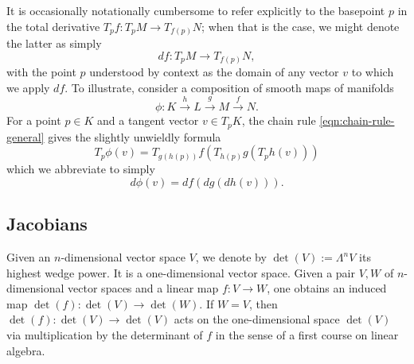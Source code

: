 \documentclass[reqno]{amsart} 
\begin{document}
It is occasionally
notationally cumbersome
to refer explicitly to the basepoint
$p$ in the total derivative $T_p f : T_p M \rightarrow T_{f(p)} N$;
when that is the case, we might denote the latter as simply
\begin{equation*}
d f : T_p M \rightarrow T_{f(p)} N,
\end{equation*}
with the point $p$ understood by context as the domain of any
vector
$v$ to which we apply $d f$.
To illustrate, consider a composition of smooth maps
of manifolds
\begin{equation*}
\phi : K \xrightarrow{h} L \xrightarrow{g} M \xrightarrow{f} N.
\end{equation*}
For a point $p \in K$ and a tangent vector $v \in T_p K$,
the chain rule \eqref{eqn:chain-rule-general}
gives the slightly unwieldly formula
\begin{equation*}
T_p \phi(v)
=
T_{g(h(p))} f
(
T_{h(p)} g(
T_p h (v)
)
)
\end{equation*}
which we abbreviate to simply
\begin{equation*}
d \phi(v)
= d f (d g( d h(v))).
\end{equation*}

\subsection{Jacobians}
\label{sec:org9589e79}
Given an $n$-dimensional vector space $V$, we denote by
$\det (V) := \Lambda^n V$ its highest wedge power.  It is a
one-dimensional vector space.  Given a pair $V,W$ of
$n$-dimensional vector spaces and a linear map
$f : V \rightarrow W$, one obtains an induced map
$\det(f) : \det(V) \rightarrow \det(W)$.  If $W = V$, then
$\det(f) : \det(V) \rightarrow \det(V)$ acts on the
one-dimensional space $\det(V)$ via multiplication by the
determinant of $f$ in the sense of a first course on linear algebra.
\end{document}
